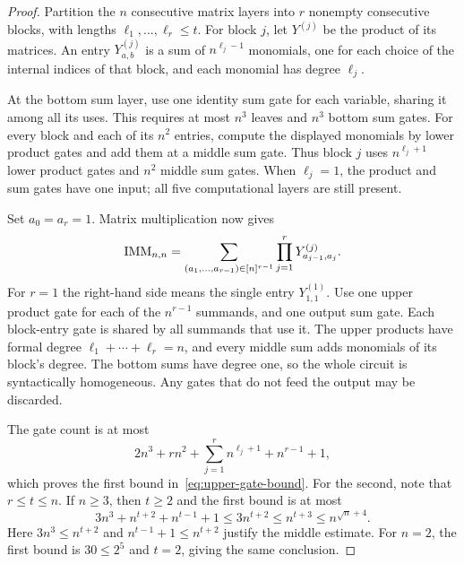 \begin{proof}
Partition the $n$ consecutive matrix layers into $r$ nonempty consecutive
blocks, with lengths $\ell_1,\ldots,\ell_r\le t$.  For block $j$, let
$Y^{(j)}$ be the product of its matrices.  An entry $Y^{(j)}_{a,b}$ is a
sum of $n^{\ell_j-1}$ monomials, one for each choice of the internal
indices of that block, and each monomial has degree $\ell_j$.

At the bottom sum layer, use one identity sum gate for each variable,
sharing it among all its uses.  This requires at most $n^3$ leaves and
$n^3$ bottom sum gates.  For every block and each of its $n^2$ entries,
compute the displayed monomials by lower product gates and add them
at a middle sum gate.  Thus block $j$ uses $n^{\ell_j+1}$ lower product
gates and $n^2$ middle sum gates.  When $\ell_j=1$, the product and sum
gates have one input; all five computational layers are still present.

Set $a_0=a_r=1$.  Matrix multiplication now gives
\[
 \operatorname{IMM}_{n,n}
 =\sum_{(a_1,\ldots,a_{r-1})\in[n]^{r-1}}
   \prod_{j=1}^{r}Y^{(j)}_{a_{j-1},a_j}.
\]
For $r=1$ the right-hand side means the single entry $Y^{(1)}_{1,1}$.
Use one upper product gate for each of the $n^{r-1}$ summands, and one
output sum gate.  Each block-entry gate is shared by all summands that
use it.  The upper products have formal degree
$\ell_1+\cdots+\ell_r=n$, and every middle sum adds monomials of its
block's degree.  The bottom sums have degree one, so the whole circuit
is syntactically homogeneous.  Any gates that do not feed the output
may be discarded.

The gate count is at most
\[
 2n^3+rn^2+\sum_{j=1}^{r}n^{\ell_j+1}+n^{r-1}+1,
\]
which proves the first bound in~\eqref{eq:upper-gate-bound}.  For the
second, note that $r\le t\le n$.  If $n\ge3$, then $t\ge2$ and the
first bound is at most
\[
 3n^3+n^{t+2}+n^{t-1}+1
 \le 3n^{t+2}
 \le n^{t+3}
 \le n^{\sqrt n+4}.
\]
Here $3n^3\le n^{t+2}$ and $n^{t-1}+1\le n^{t+2}$ justify the middle
estimate.  For $n=2$, the first bound is $30\le2^5$ and $t=2$, giving
the same conclusion.
\end{proof}
